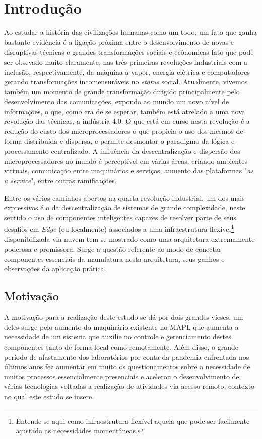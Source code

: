 \chapter[Introdução]{Introdução}

Ao estudar a história das civilizações humanas como um todo, um fato que ganha bastante evidência é a ligação próxima 
entre o desenvolvimento de novas e disruptivas técnicas e grandes transformações sociais e ecônomicas fato que pode 
ser obsevado muito claramente, nas três primeiras revoluções industriais com a inclusão, respectivamente, da máquina 
a vapor, energia elétrica e computadores gerando transformações incomensuráveis no \textit{status} social. Atualmente,
vivemos também um momento de grande transformação dirigido principalmente pelo desenvolvimento das comunicações, expondo 
ao mundo um novo nível de informações, o que, como era de se esperar, também está atrelado a uma nova revolução das 
técnicas, a indústria 4.0. O que está em curso nesta revolução é a redução do custo dos microprocessadores o que propicia
o uso dos mesmos de forma distribuída e dispersa, e permite desmontar o paradigma da lógica e processamento centralizado.
A influência da descentralização e dispersão dos microprocessadores no mundo é perceptível em várias áreas: criando
ambientes virtuais, comunicação entre maquinários e serviços, aumento das 
plataformas "\textit{as a service}", entre outras ramificações.

Entre os vários caminhos abertos na quarta revolução industrial, um dos mais expressivos é o da descentralização de sistemas
de grande complexidade, neste sentido o uso de componentes inteligentes capazes de resolver parte de seus desafios em 
\textit{Edge} (ou localmente) associados a uma infraestrutura flexível\footnote{Entende-se aqui como infraestrutura flexível aquela que 
pode ser facilmente ajustada as necessidades momentâneas.} disponibilizada via nuvem tem se mostrado como uma arquitetura 
extremamente poderosa e promissora. Surge a questão referente ao modo de conectar componentes essenciais da manufatura
nesta arquitetura, seus ganhos e observações da aplicação prática.


\section{Motivação}
A motivação para a realização deste estudo se dá por dois grandes vieses, um deles surge pelo aumento do maquinário 
existente no \ac{MAPL} que aumenta a necessidade de um sistema que auxilie no controle e gerenciamento destes componentes
tanto de forma local como remotamente. Além disso, o grande período de afastamento dos laboratórios por conta da 
pandemia enfrentada nos últimos anos fez aumentar em muito os questionamentos sobre a necessidade de muitos processos 
essencialmente presenciais e acelerou o desenvolvimento de várias tecnologias voltadas a realização de atividades via acesso
remoto, contexto no qual este estudo se insere.

